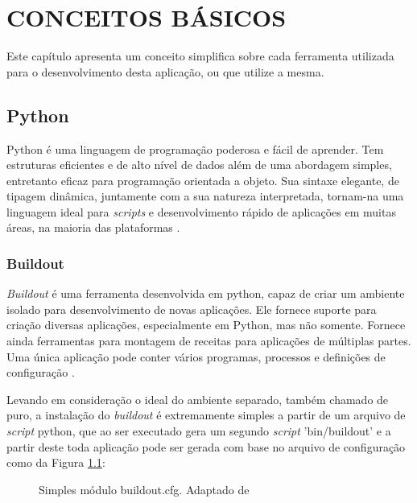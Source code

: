 \chapter{CONCEITOS BÁSICOS}

Este capítulo apresenta um conceito simplifica sobre cada ferramenta utilizada para o desenvolvimento desta aplicação, ou que utilize a mesma.

\section{Python}

Python é uma linguagem de programação poderosa e fácil de aprender. Tem estruturas eficientes e de alto nível de dados além de uma abordagem simples, entretanto eficaz para programação orientada a objeto. Sua sintaxe elegante, de tipagem dinâmica, juntamente com a sua natureza interpretada, tornam-na uma linguagem ideal para \textit{scripts} e desenvolvimento rápido de aplicações em muitas áreas, na maioria das plataformas \cite{GUIDO}.

\subsection{Buildout}

\textit{Buildout} é uma ferramenta desenvolvida em python, capaz de criar um ambiente isolado para desenvolvimento de novas aplicações. Ele fornece suporte para criação diversas aplicações, especialmente em Python, mas não somente. Fornece ainda ferramentas para montagem de receitas para aplicações de múltiplas partes. Uma única aplicação pode conter vários programas, processos e definições de configuração \cite{BRANDOM}.

Levando em consideração o ideal do ambiente separado, também chamado de puro, a instalação do \textit{buildout} é extremamente simples a partir de um arquivo de \textit{script} python, que ao ser executado gera um segundo \textit{script} 'bin/buildout' e a partir deste toda aplicação pode ser gerada com base no arquivo de configuração como da Figura \ref{buildout}:

\begin{figure}[ht]
    \centering
    \caption{Simples módulo buildout.cfg. Adaptado de \cite{ZOPE-FOUNDATION-BUILDOUT}}
    \label{buildout}
\end{figure}

